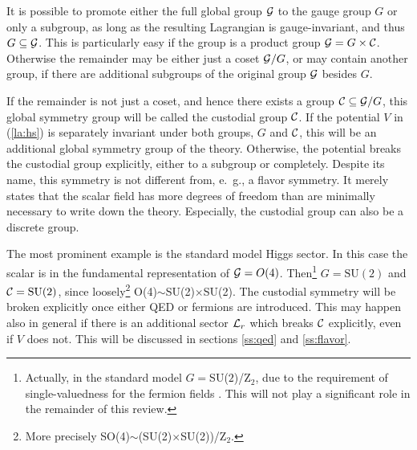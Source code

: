 \documentclass[final,twoside,12pt]{article}
\newcommand*{\La}{{\cal{L}}}
\newcommand*{\pref}[1]{(\ref{#1})}
\newcommand*{\1}{1\!\!\!\bot}
\begin{document}
It is possible to promote either the full global group ${\cal G}$ to the gauge group $G$ or only a subgroup, as long as the resulting Lagrangian is gauge-invariant, and thus $G\subseteq{\cal G}$. This is particularly easy if the group is a product group ${\cal G}=G\times{\cal C}$. Otherwise the remainder may be either just a coset ${\cal G}/G$, or may contain another group, if there are additional subgroups of the original group ${\cal G}$ besides $G$.

If the remainder is not just a coset, and hence there exists a group ${\cal C}\subseteq{\cal G}/G$, this global symmetry group will be called the custodial group ${\cal C}$. If the potential $V$ in \pref{la:hs} is separately invariant under both groups, $G$ and ${\cal C}$, this will be an additional global symmetry group of the theory. Otherwise, the potential breaks the custodial group explicitly, either to a subgroup or completely. Despite its name, this symmetry is not different from, e.\ g., a flavor symmetry. It merely states that the scalar field has more degrees of freedom than are minimally necessary to write down the theory. Especially, the custodial group can also be a discrete group.

The most prominent example is the standard model Higgs sector. In this case the scalar is in the fundamental representation of ${\cal G}=O(4)$. Then\footnote{Actually, in the standard model $G=$SU($2$)/Z$_2$, due to the requirement of single-valuedness for the fermion fields \cite{O'Raifeartaigh:1986vq}. This will not play a significant role in the remainder of this review.} $G=\text{SU}(2)$ and ${\cal C}=\text{SU}(2)$, since loosely\footnote{More precisely SO(4)$\sim$(SU(2)$\times$SU(2))/Z$_2$.} O(4)$\sim$SU(2)$\times$SU(2). The custodial symmetry will be broken explicitly once either QED or fermions are introduced. This may happen also in general if there is an additional sector $\La_r$ which breaks ${\cal C}$ explicitly, even if $V$ does not. This will be discussed in sections \ref{ss:qed} and \ref{ss:flavor}.
\end{document}
